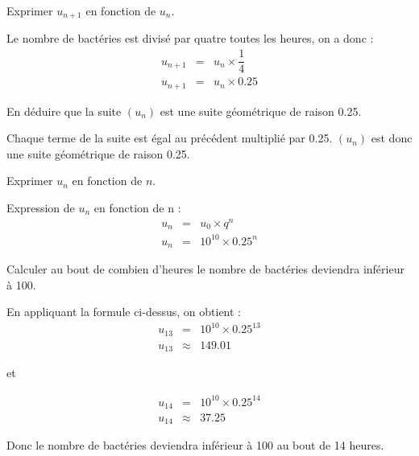 \begin{questions}
	\question[1] Exprimer $u_{n+1}$ en fonction de $u_n$.
	\begin{solution}
		Le nombre de bactéries est divisé par quatre toutes les heures, on a donc :
		\begin{eqnarray*}
			u_{n+1} &=& u_n \times \dfrac{1}{4}\\
			u_{n+1} &=& u_n \times \num{0.25}
		\end{eqnarray*}
	\end{solution}
	
	\question[1] En déduire que la suite $(u_n)$ est une suite géométrique de raison \num{0.25}.
	\begin{solution}
		Chaque terme de la suite est égal au précédent multiplié par \num{0.25}. $(u_n)$ est donc une suite géométrique de raison \num{0.25}.
	\end{solution}
	
	\question[1] Exprimer $u_n$ en fonction de $n$.
	\begin{solution}
		Expression de $u_n$ en fonction de n :
		\begin{eqnarray*}
			u_n &=& u_0 \times q^n \\
			u_n &=& 10^{10} \times \num{0.25}^n 
		\end{eqnarray*}
	\end{solution}
	
	\question[2] Calculer au bout de combien d'heures le nombre de bactéries deviendra inférieur à 100. 
	\begin{solution}
		En appliquant la formule ci-dessus, on obtient :
		\begin{eqnarray*}
			u_13 &=& 10^10 \times 0.25^{13} \\
			u_13 &\approx& \num{149.01}
		\end{eqnarray*}
	
		et
		
		\begin{eqnarray*}
			u_14 &=& 10^10 \times 0.25^{14} \\
			u_14 &\approx& \num{37.25}
		\end{eqnarray*}
	
	Donc le nombre de bactéries deviendra inférieur à 100 au bout de 14 heures.
	\end{solution}
\end{questions}